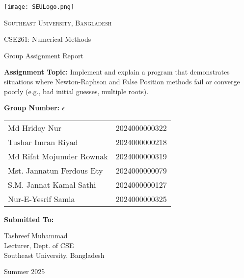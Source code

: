 \documentclass[12pt,a4paper]{article}
\begin{document}
\begin{titlepage}
    \centering
    \texttt{[image: SEULogo.png]}\par\vspace{1cm}
    {\scshape\LARGE Southeast University, Bangladesh \par}
    \vspace{1cm}
    {\Large CSE261: Numerical Methods \par}
    \vspace{0.5cm}
    {\Large Group Assignment Report \par}
    \vspace{1.5cm}
    {\large \textbf{Assignment Topic:} Implement and explain a program that demonstrates situations where Newton-Raphson and False Position methods fail or converge poorly (e.g., bad initial guesses, multiple roots). \par}
    \vfill
    \textbf{Group Number: $\epsilon$ } \par
    \begin{tabular}{ll}
       Md Hridoy Nur & 2024000000322 \\
       Tushar Imran Riyad  & 2024000000218 \\
       Md Rifat Mojumder Rownak & 2024000000319 \\
       Mst. Jannatun Ferdous Ety & 2024000000079 \\
       S.M. Jannat Kamal Sathi & 2024000000127 \\
       Nur-E-Yesrif Samia & 2024000000325 \\
    \end{tabular}
    \vfill

    \textbf{Submitted To:}  \par
    [TMD] Tashreef Muhammad  \\
    Lecturer, Dept. of CSE  \\
    Southeast University, Bangladesh \par
    \vfill
    Summer 2025
\end{titlepage}
\end{document}
